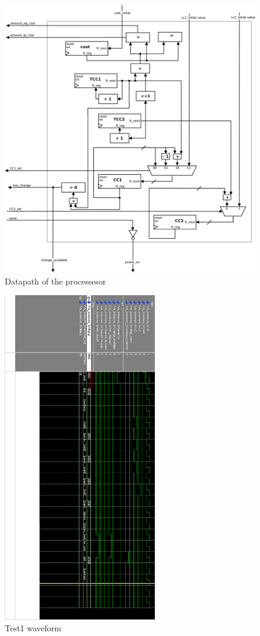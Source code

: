 \begin{figure}
\centering
\includegraphics[width=1.0\textwidth]{fig/datapath.pdf}
\caption{Datapath of the processesor}
\label{fig:datapath}
\end{figure}

\begin{figure}
\centering
\includegraphics[width=0.6\textwidth]{img/wavetest1.png}
\caption{Test1 waveform}
\label{fig:test1}
\end{figure}

